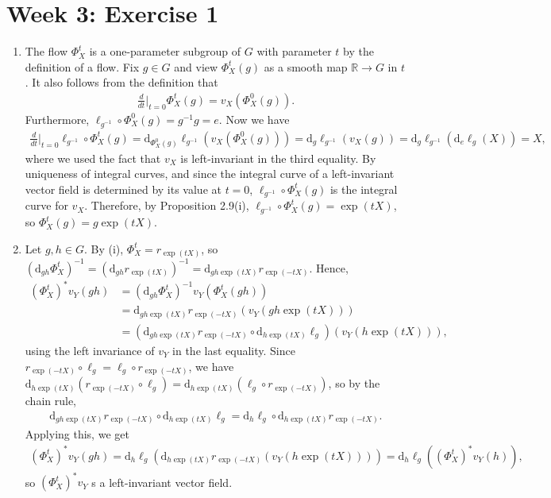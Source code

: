 \documentclass{article}
\newcommand{\bb}{\mathbb}
\theoremstyle{remark}
\renewcommand{\d}{\mathrm{d}}
\begin{document}
\section*{Week 3: Exercise 1}
\begin{enumerate}[label=(\roman*)]
    \item The flow $\Phi^t_X$ is a one-parameter subgroup of $G$ with parameter $t$ by the definition of a flow. Fix $g \in G$ and view $\Phi^t_X(g)$ as a smooth map $\bb{R} \to G$ in $t$. It also follows from the definition that
    \begin{align*}
        \frac{d}{dt}\bigg|_{t=0} \Phi^t_X(g) = v_X(\Phi^0_X(g)).
    \end{align*}
    Furthermore, $\ell_{g^{-1}} \circ \Phi^0_X(g) = g^{-1}g = e$. Now we have
    \begin{align*}
        \frac{d}{d t} \bigg|_{t=0} \ell_{g^{-1}} \circ \Phi^t_X(g) = \d_{\Phi^0_X(g)}\ell_{g^{-1}}\left(v_X\left(\Phi^0_X(g)\right)\right) = \d_g \ell_{g^{-1}} (v_X(g)) = \d_g \ell_{g^{-1}}(\d_e \ell_g (X)) = X,
    \end{align*}
    where we used the fact that $v_X$ is left-invariant in the third equality. By uniqueness of integral curves, and since the integral curve of a left-invariant vector field is determined by its value at $t=0$, $\ell_{g^{-1}} \circ \Phi^t_X(g)$ is the integral curve for $v_X$. Therefore, by Proposition 2.9(i), $\ell_{g^{-1}} \circ \Phi^t_X(g) = \exp(tX)$, so $\Phi^t_X(g) = g\exp(tX)$.

    \item Let $g,h \in G$. By (i), $\Phi^t_X = r_{\exp(tX)}$, so $(\d_{gh} \Phi^t_X)^{-1} = (\d_{gh} r_{\exp(tX)})^{-1} = \d_{gh\exp(tX)} r_{\exp(-tX)}$. Hence,
    \begin{align*}
        (\Phi^t_X)^*v_Y(gh) &= (\d_{gh} \Phi^t_X)^{-1} v_Y(\Phi^t_X(gh)) \\
        &= \d_{gh \exp(tX)} r_{\exp(-tX)} (v_Y(gh \exp(tX))) \\
        &= (\d_{gh \exp(tX)} r_{\exp(-tX)} \circ \d_{h \exp(tX)} \ell_g) (v_Y(h\exp(tX))),
    \end{align*}
    using the left invariance of $v_Y$ in the last equality. Since $r_{\exp(-tX)} \circ \ell_g = \ell_g \circ r_{\exp(-tX)}$, we have $\d_{h \exp(tX)} (r_{\exp(-tX)} \circ \ell_g) = \d_{h \exp(tX)} (\ell_g \circ r_{\exp(-tX)})$, so by the chain rule,
    \begin{align*}
        \d_{gh\exp(tX)} r_{\exp(-tX)} \circ \d_{h \exp(tX)} \ell_g = \d_h \ell_g \circ \d_{h\exp(tX)} r_{\exp(-tX)}.
    \end{align*}
    Applying this, we get
    \begin{align*}
         (\Phi^t_X)^*v_Y(gh) = \d_h \ell_g \left(\d_{h \exp(tX)} r_{\exp(-tX)} \left(v_Y(h\exp(tX))\right)\right) = \d_h \ell_g \left( (\Phi^t_X)^* v_Y(h) \right),
    \end{align*}
    so $(\Phi^t_X)^* v_Y$ s a left-invariant vector field.


\end{enumerate}
\end{document}
